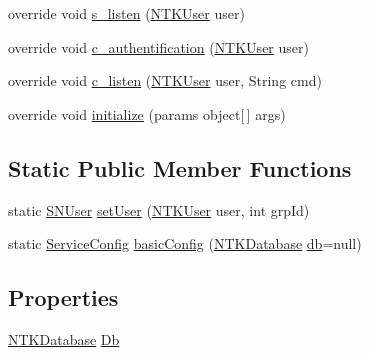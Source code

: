 \begin{DoxyCompactItemize}
override void \mbox{\hyperlink{class_n_t_k_1_1_service_1_1_n_t_k_s___s_n_a4fd6ae452b8b494efe62d966eb8d23c8}{s\+\_\+listen}} (\mbox{\hyperlink{class_n_t_k_1_1_n_t_k_user}{N\+T\+K\+User}} user)
\item 
override void \mbox{\hyperlink{class_n_t_k_1_1_service_1_1_n_t_k_s___s_n_ac025f78ece6a9012aeb014fbd486aee7}{c\+\_\+authentification}} (\mbox{\hyperlink{class_n_t_k_1_1_n_t_k_user}{N\+T\+K\+User}} user)
\item 
override void \mbox{\hyperlink{class_n_t_k_1_1_service_1_1_n_t_k_s___s_n_a70710f4c30863d2cab91c62b9f52a040}{c\+\_\+listen}} (\mbox{\hyperlink{class_n_t_k_1_1_n_t_k_user}{N\+T\+K\+User}} user, String cmd)
\item 
override void \mbox{\hyperlink{class_n_t_k_1_1_service_1_1_n_t_k_s___s_n_aeebcac59f0a3746bbf307c3d4cb98d76}{initialize}} (params object\mbox{[}$\,$\mbox{]} args)
\end{DoxyCompactItemize}
\subsection*{Static Public Member Functions}
\begin{DoxyCompactItemize}
\item 
static \mbox{\hyperlink{class_n_t_k_1_1_service_1_1_s_n_user}{S\+N\+User}} \mbox{\hyperlink{class_n_t_k_1_1_service_1_1_n_t_k_s___s_n_a6024241f2a1ce46ad6c2b6d6f1aef140}{set\+User}} (\mbox{\hyperlink{class_n_t_k_1_1_n_t_k_user}{N\+T\+K\+User}} user, int grp\+Id)
\item 
static \mbox{\hyperlink{struct_n_t_k_1_1_service_1_1_service_config}{Service\+Config}} \mbox{\hyperlink{class_n_t_k_1_1_service_1_1_n_t_k_s___s_n_a1b516ac4853742abf2d3daed66c20277}{basic\+Config}} (\mbox{\hyperlink{class_n_t_k_1_1_database_1_1_n_t_k_database}{N\+T\+K\+Database}} \mbox{\hyperlink{class_n_t_k_1_1_service_1_1_n_t_k_service_a68903e0a461b9bb373db39304e3ad9be}{db}}=null)
\end{DoxyCompactItemize}
\subsection*{Properties}
\begin{DoxyCompactItemize}
\item 
\mbox{\hyperlink{class_n_t_k_1_1_database_1_1_n_t_k_database}{N\+T\+K\+Database}} \mbox{\hyperlink{class_n_t_k_1_1_service_1_1_n_t_k_s___s_n_afb22d20b99934187701c3fd81da89583}{Db}}
\end{DoxyCompactItemize}
